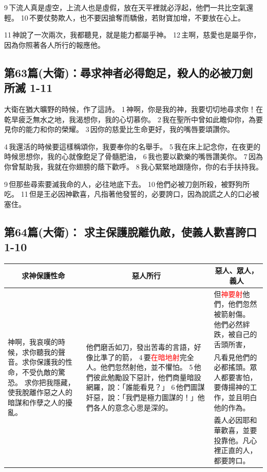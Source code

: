 9 下流人真是虛空，上流人也是虛假，放在天平裡就必浮起，他們一共比空氣還輕。
10 不要仗勢欺人，也不要因搶奪而驕傲，若財寶加增，不要放在心上。

11 神說了一次兩次，我都聽見，就是能力都屬乎神。
12 主啊，慈愛也是屬乎你，因為你照著各人所行的報應他。

\subsection{第63篇(大衛)：尋求神者必得飽足，殺人的必被刀劍所滅  1-11}

大衛在猶大曠野的時候，作了這詩。
1 神啊，你是我的神，我要切切地尋求你！在乾旱疲乏無水之地，我渴想你，我的心切慕你。
2 我在聖所中曾如此瞻仰你，為要見你的能力和你的榮耀。
3 因你的慈愛比生命更好，我的嘴唇要頌讚你。

4 我還活的時候要這樣稱頌你，我要奉你的名舉手。
5 我在床上記念你，在夜更的時候思想你，我的心就像飽足了骨髓肥油，
6 我也要以歡樂的嘴唇讚美你。
7 因為你曾幫助我，我就在你翅膀的蔭下歡呼。
8 我心緊緊地跟隨你，你的右手扶持我。

9 但那些尋索要滅我命的人，必往地底下去。
10 他們必被刀劍所殺，被野狗所吃。
11 但是王必因神歡喜，凡指著他發誓的，必要誇口，因為說謊之人的口必被塞住。


\subsection{第64篇(大衛)： 求主保護脫離仇敵，使義人歡喜誇口 1-10}
\begin{table}[H]
\centering
\begin{tabular}{p{3.7cm}|p{6.5cm}|p{6.4cm}}\hline\hline
\multicolumn{1}{c|}{求神保護性命}&\multicolumn{1}{c|}{惡人所行}&\multicolumn{1}{c}{惡人、眾人，義人}\\\hline
\multirow{3}{3.8cm}{神啊，我哀嘆的時候，求你聽我的聲音。求你保護我的性命，不受仇敵的驚恐。
求你把我隱藏，使我脫離作惡之人的暗謀和作孽之人的擾亂。}
&\multirow{3}{6.6cm}{他們磨舌如刀，發出苦毒的言語，好像比準了的箭，
4 要\textcolor{red}{在暗地射}完全人。他們忽然射他，並不懼怕。
5 他們彼此勉勵設下惡計，他們商量暗設網羅，說：「誰能看見？」
6 他們圖謀奸惡，說：「我們是極力圖謀的！」他們各人的意念心思是深的。}
&但\textcolor{red}{神要射}他們，他們忽然被箭射傷。
他們必然絆跌，被自己的舌頭所害，\\\cline{3-3}
&&凡看見他們的必都搖頭。眾人都要害怕，要傳揚神的工作，並且明白他的作為。\\\cline{3-3}
&&義人必因耶和華歡喜，並要投靠他。凡心裡正直的人，都要誇口。\\\hline
\end{tabular}
\end{table} 



